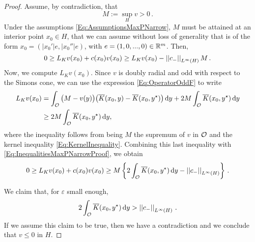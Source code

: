 \begin{proof}
	Assume, by contradiction, that
	$$
	M := \sup_H v > 0\,.
	$$
	Under the assumptions \eqref{Eq:AssumptionsMaxPNarrow}, $M$ must be attained at an interior point $x_0 \in H$, that we can assume without loss of generality that is of the form $x_0 = (|x_0'|e,|x_0''|e)$, with $e=(1,0,...,0)\in\mathbb{R}^m$. Then,
	\begin{equation}
	\label{Eq:InequalitiesMaxPNarrowProof}
	0 \geq L_K  v(x_0) + c(x_0)v(x_0) \geq L_K  v(x_0) - \left | \left |{c_-} \right | \right |_{L^\infty(H)}M\,.
	\end{equation} 
	Now, we compute $L_K  v(x_0)$. Since $v$ is doubly radial and odd with respect to the Simons cone, we can use the expression \eqref{Eq:OperatorOddF} to write
	\begin{align*}
	L_K v(x_0) &= \int_{\mathcal{O}} \big (M - v(y) \big) \big (\overline{K}(x_0,y) -\overline{K}(x_0,y^\star)\big) \,\mathrm{d} y + 2M\int_{\mathcal{O}} \overline{K}(x_0,y^\star)\,\mathrm{d} y\\
    &\geq2M \int_{\mathcal{O}} \overline{K}(x_0,y^\star)\,\mathrm{d} y,
	\end{align*}
    where the inequality follows from being $M$ the supremum of $v$ in $\mathcal{O}$ and the kernel inequality \eqref{Eq:KernelInequality}. Combining this last inequality with \eqref{Eq:InequalitiesMaxPNarrowProof}, we obtain
	$$
	0 \geq L_K  v(x_0) + c(x_0)v(x_0)  \geq M \left\{ 2 \int_{\mathcal{O}} \overline{K}(x_0,y^\star)\,\mathrm{d} y - \left | \left |{c_-} \right | \right |_{L^\infty(H)}
	\right\}\,.
	$$
	
	We claim that, for $\varepsilon$ small enough,
	\begin{equation}
	\label{Eq:ClaimMaxPNarrowProof}
	 2 \int_{\mathcal{O}} \overline{K}(x_0,y^\star)\,\mathrm{d} y > \left | \left |{c_-} \right | \right |_{L^\infty(H)}\,.
	\end{equation}
	If we assume this claim to be true, then we have a contradiction and we conclude that $v \leq 0$ in $H$.
	

\end{proof}
